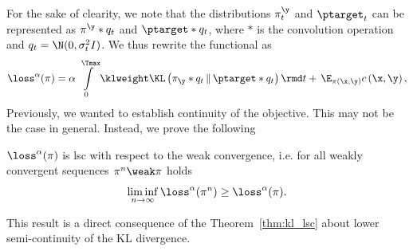 For the sake of clearity, we note that the distributions $\pi^{\y}_t$ and $\ptarget_t$ can be represented as $\pi^{\y} * q_t$ and $\ptarget * q_t$, where $*$ is the convolution operation and $q_t = \N(0, \sigma_t^2 I)$. We thus rewrite the functional as
\begin{equation}
    \loss^\alpha(\pi) = \alpha\, \int\limits_{0}^{\Tmax} \klweight \KL\left(\pi_{\y} * q_t \,\|\, \ptarget * q_t \right) \rmd t + \,\E_{\pi(\x, \y)} c\left(\x, \y\right),
\end{equation}
Previously, we wanted to establish continuity of the objective. This may not be the case in general. Instead, we prove the following
\begin{lemma}
    $\loss^\alpha(\pi)$ is lsc with respect to the weak convergence, i.e. for all weakly convergent sequences $\pi^n \weak \pi$ holds 
    \begin{equation}
        \liminf\limits_{n \rightarrow \infty} \loss^\alpha(\pi^n) \geq \loss^\alpha(\pi).
    \end{equation}
\end{lemma}
This result is a direct consequence of the Theorem~\ref{thm:kl_lsc} about lower semi-continuity of the KL divergence.
